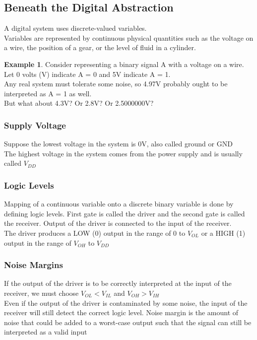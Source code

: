 \documentclass[12pt]{article}
\theoremstyle{definition}
\newtheorem{ex}{Example}[section]
\begin{document}
  \subsection{Beneath the Digital Abstraction}
  A digital system uses discrete-valued variables. \\
  Variables are represented by continuous physical quantities such as the voltage on a wire, the position of a gear, or the level of fluid in a cylinder.
  \begin{ex}
    Consider representing a binary signal A with a voltage on a wire. \\
    Let 0 volts (V) indicate A = 0 and 5V indicate A = 1. \\
    Any real system must tolerate some noise, so 4.97V probably ought to be interpreted as A = 1 as well. \\
    But what about 4.3V? Or 2.8V? Or 2.5000000V?
  \end{ex}
  \subsubsection{Supply Voltage}
  Suppose the lowest voltage in the system is 0V, also called ground or GND \\
  The highest voltage in the system comes from the power supply and is usually called $V_{DD}$

  \subsubsection{Logic Levels}
  Mapping of a continuous variable onto a discrete binary variable is done by defining logic levels.
  First gate is called the driver and the second gate is called the receiver.
  Output of the driver is connected to the input of the receiver. \\
  The driver produces a LOW (0) output in the range of 0 to $V_{OL}$ or a HIGH (1) output in the range of $V_{OH}$ to $V_{DD}$

  \subsubsection{Noise Margins}
  If the output of the driver is to be correctly interpreted at the input of the receiver, we must choose $V_{OL} < V_{IL}$ and $V_{OH} > V_{IH}$ \\
  Even if the output of the driver is contaminated by some noise, the input of the receiver will still detect the correct logic level.
  Noise margin is the amount of noise that could be added to a worst-case output such that the signal can still be interpreted as a valid input
\end{document}
